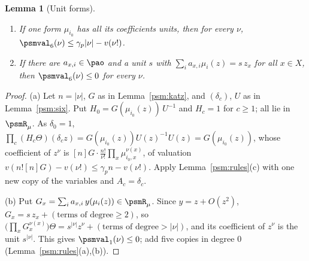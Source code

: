 \documentclass[10pt]{amsart}
\newtheorem{lemma}[theorem]{Lemma}
\theoremstyle{definition}
\theoremstyle{remark}
\begin{document}
\begin{lemma}[Unit forms]\label{psm:unitform}
\begin{enumerate}
\item[(a)] If one form $\mu_{i_0}$ has all its coefficients units, then for every $\nu$,
$\psmval_6(\nu)\le\gamma_p|\nu|-v(\nu!)$.
\item[(b)] If there are $a_{x,i}\in\pao$ and a unit $s$ with $\sum_ia_{x,i}\mu_i(z)=s\,z_x$ for
all $x\in X$, then $\psmval_6(\nu)\le0$ for every $\nu$.
\end{enumerate}
\end{lemma}
\begin{proof}
(a) Let $n=|\nu|$, $G$ as in Lemma~\ref{psm:katz}, and $(\delta_c)$, $U$ as in
Lemma~\ref{psm:six}. Put $H_0=G(\mu_{i_0}(z))\,U^{-1}$ and $H_c=1$ for $c\ge1$; all lie in
$\psmR_\mu$. As $\delta_0=1$, $\prod_c(H_c\Theta)(\delta_cz)=G(\mu_{i_0}(z))U(z)^{-1}U(z)=
G(\mu_{i_0}(z))$, whose coefficient of $z^\nu$ is $[n]G\cdot\frac{n!}{\nu!}\prod_x\mu_{i_0,x}^{\nu(x)}$,
of valuation $v(n![n]G)-v(\nu!)\le\gamma_pn-v(\nu!)$. Apply Lemma~\ref{psm:rules}(c) with one new
copy of the variables and $A_c=\delta_c$.

(b) Put $G_x=\sum_ia_{x,i}\,y(\mu_i(z))\in\psmR_\mu$. Since $y=z+O(z^2)$, $G_x=s\,z_x+(\text{terms of
degree}\ge2)$, so $\bigl(\prod_xG_x^{\nu(x)}\bigr)\Theta=s^{|\nu|}z^\nu+(\text{terms of degree}>
|\nu|)$, and its coefficient of $z^\nu$ is the unit $s^{|\nu|}$. This gives $\psmval_1(\nu)\le0$;
add five copies in degree $0$ (Lemma~\ref{psm:rules}(a),(b)).
\end{proof}
\end{document}
